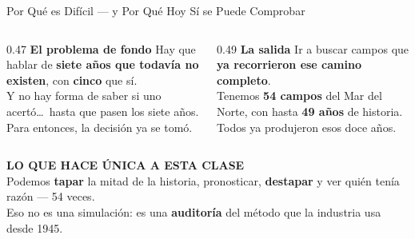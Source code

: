 \documentclass[aspectratio=169, 11pt]{beamer}
\begin{document}
\begin{frame}[shrink=6]{Por Qué es Difícil --- y Por Qué Hoy Sí se Puede Comprobar}
  \vspace{-2pt}
  \begin{columns}[T]
    \begin{column}{0.47\textwidth}
      {\small\color{arcaDark}\bfseries\faQuestion\hspace{5pt}El problema de fondo}
      \vspace{5pt}
      {\footnotesize\color{textMuted}
      Hay que hablar de \textbf{siete años que todavía no existen}, con
      \textbf{cinco} que sí.\\[6pt]
      Y no hay forma de saber si uno acertó\dots\ hasta que pasen los siete
      años. Para entonces, la decisión ya se tomó.}
    \end{column}
    \begin{column}{0.49\textwidth}
      {\small\color{arcaDark}\bfseries\faCheckCircle\hspace{5pt}La salida}
      \vspace{5pt}
      {\footnotesize\color{textMuted}
      Ir a buscar campos que \textbf{ya recorrieron ese camino completo}.\\[6pt]
      Tenemos \textbf{54 campos} del Mar del Norte, con hasta \textbf{49 años}
      de historia. Todos ya produjeron esos doce años.}
    \end{column}
  \end{columns}
  \vspace{10pt}
  \begin{tcolorbox}[colback=arcaGray, colframe=codeGreen, boxrule=0pt, leftrule=3pt,
    arc=3pt, left=8pt, right=8pt, top=6pt, bottom=6pt]
    {\small\color{codeGreen}\bfseries\faStar\hspace{5pt}LO QUE HACE ÚNICA A ESTA CLASE}\\[5pt]
    {\footnotesize\color{textMuted}
     Podemos \textbf{tapar} la mitad de la historia, pronosticar,
     \textbf{destapar} y ver quién tenía razón --- 54 veces.\\[4pt]
     Eso no es una simulación: es una \textbf{auditoría} del método que la
     industria usa desde 1945.}
  \end{tcolorbox}
\end{frame}
\end{document}
